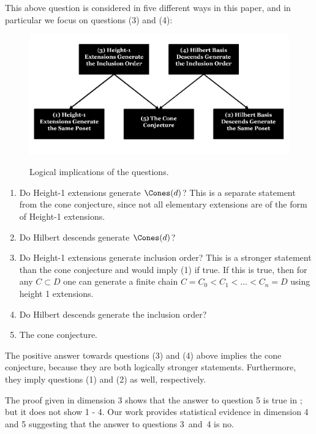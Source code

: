 \documentclass{TC}
\begin{document}
This above question is considered in five different ways in this paper, and in particular we focus on questions (3) and (4):
{
\begin{figure}[h]
\centering
\includegraphics[width=.95\textwidth]{Questions}
\label{coneconjecturequestions}
\caption{Logical implications of the questions.}
\end{figure}
}
\begin{enumerate}[(1)]
\item Do Height-1 extensions generate $\Cones(d)$? This is a separate statement from the cone conjecture, since not all elementary extensions are of the form of Height-1 extensions.
\item Do Hilbert descends generate $\Cones(d)$? 
\item Do Height-1 extensions generate inclusion order? This is a stronger statement than the cone conjecture and would imply (1) if true. If this is true, then for any $C \subset D$ one can generate a finite chain $C = C_0 < C_1 <\ldots< C_n = D$ using height 1 extensions.
\item Do Hilbert descends generate the inclusion order?
\item The cone conjecture.

\end{enumerate}

The positive answer towards questions (3) and (4) above implies the cone conjecture, because they are both logically stronger statements. Furthermore, they imply questions (1) and (2) as well, respectively. 

The proof given in dimension 3 shows that the answer to question 5 is true in \cite{GubeladzePosetCones}; but it does not show 1 - 4. Our work provides statistical evidence in dimension 4 and 5 suggesting that the answer to questions 3~and~4 is no.
\end{document}
